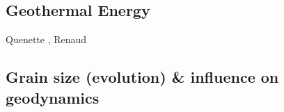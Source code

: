 \subsection{Geothermal Energy} 

\begin{scriptsize}
Quenette \etal \cite{quxm15}, Renaud \etal \cite{revf19}
\end{scriptsize}

\subsection{Grain size (evolution) \& influence on geodynamics}
\label{sec:topics:gsev}


